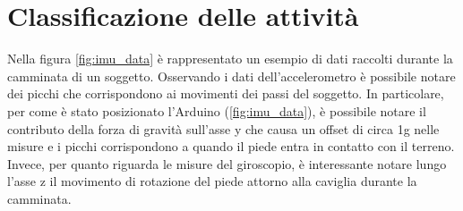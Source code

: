 \clearpage

\section{Classificazione delle attività} \label{classifSect}
Nella figura \ref{fig:imu_data} è rappresentato un esempio di dati raccolti durante la camminata di un soggetto. Osservando i dati dell'accelerometro è possibile notare dei picchi che corrispondono ai movimenti dei passi del soggetto. In particolare, per come è stato posizionato l'Arduino (\Fig\ref{fig:imu_data}), è possibile notare il contributo della forza di gravità sull'asse y che causa un offset di circa 1g nelle misure e i picchi corrispondono a quando il piede entra in contatto con il terreno. Invece, per quanto riguarda le misure del giroscopio, è interessante notare lungo l'asse z il movimento di rotazione del piede attorno alla caviglia durante la camminata. 

